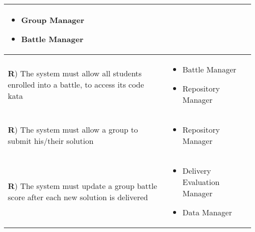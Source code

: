 \documentclass[../DD.tex]{subfiles}
\newcounter{rown}
\newcommand{\rowIndex}{\arabic{rown}\stepcounter{rown}}
\begin{document}
\begin{table}[h!]
\begin{center}
\begin{tabular}{|m{20em}|m{20em}|}
\begin{itemize}
                \item Group Manager
                \item Battle Manager  
            \end{itemize}\\
            \hline
            \textbf{R\rowIndex}) The system must allow all students enrolled into a battle, to access its code kata & \begin{itemize}
                \item Battle Manager
                \item Repository Manager
            \end{itemize}\\
            \hline
            \textbf{R\rowIndex}) The system must allow a group to submit his/their solution & \begin{itemize}
                \item Repository Manager
            \end{itemize}\\
            \hline
            \textbf{R\rowIndex}) The system must update a group battle score after each new solution is delivered & \begin{itemize}
                \item Delivery Evaluation Manager
                \item Data Manager
            \end{itemize}\\
            \hline
            \end{tabular}
        \end{center}
    \end{table}
    \newpage
\end{document}
